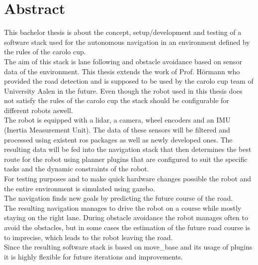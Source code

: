 \chapter*{Abstract}
\label{abstract}
This bachelor thesis is about the concept, setup/development and testing of a software stack used for the autonomous navigation in an environment defined by the rules of the carolo cup.\\

 The aim of this stack is lane following and obstacle avoidance based on sensor data of the environment. This thesis extends the work of Prof. Hörmann who provided the road detection and is supposed to be used by the carolo cup team of University Aalen in the future. Even though the robot used in this thesis does not satisfy the rules of the carolo cup the stack should be configurable for different robots aswell.\\

The robot is equipped with a lidar, a camera, wheel encoders and an IMU (Inertia Measurement Unit). The data of these sensors will be filtered and processed using existent ros packages as well as newly developed ones. The resulting data will be fed into the navigation stack that then determines the best route for the robot using planner plugins that are configured to suit the specific tasks and the dynamic constraints of the robot.\\

For testing purposes and to make quick hardware changes possible the robot and the entire environment is simulated using gazebo.\\

The navigation finds new goals by predicting the future course of the road.\\

The resulting navigation manages to drive the robot on a course while mostly staying on the right lane. During obstacle avoidance the robot manages often to avoid the obstacles, but in some cases the estimation of the future road course is to imprecise, which leads to the robot leaving the road.\\

Since the resulting software stack is based on move\_base and its usage of plugins it is highly flexible for future iterations and improvements.\\